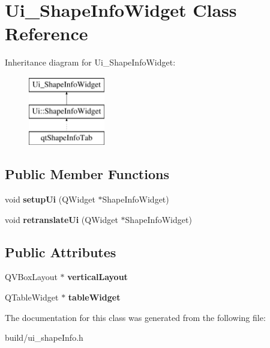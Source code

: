 \hypertarget{class_ui___shape_info_widget}{}\section{Ui\+\_\+\+Shape\+Info\+Widget Class Reference}
\label{class_ui___shape_info_widget}
Inheritance diagram for Ui\+\_\+\+Shape\+Info\+Widget\+:\begin{figure}[H]
\begin{center}
\leavevmode
\includegraphics[height=3.000000cm]{class_ui___shape_info_widget}
\end{center}
\end{figure}
\subsection*{Public Member Functions}
\begin{DoxyCompactItemize}
\item 
\hypertarget{class_ui___shape_info_widget_ab161b351a7474311a9a94a0723714aaf}{}void {\bfseries setup\+Ui} (Q\+Widget $\ast$Shape\+Info\+Widget)\label{class_ui___shape_info_widget_ab161b351a7474311a9a94a0723714aaf}

\item 
\hypertarget{class_ui___shape_info_widget_a266a6be952218bcc6e380a8f32f4b768}{}void {\bfseries retranslate\+Ui} (Q\+Widget $\ast$Shape\+Info\+Widget)\label{class_ui___shape_info_widget_a266a6be952218bcc6e380a8f32f4b768}

\end{DoxyCompactItemize}
\subsection*{Public Attributes}
\begin{DoxyCompactItemize}
\item 
\hypertarget{class_ui___shape_info_widget_a50ce45786d697a4f04b47f541bea9fe1}{}Q\+V\+Box\+Layout $\ast$ {\bfseries vertical\+Layout}\label{class_ui___shape_info_widget_a50ce45786d697a4f04b47f541bea9fe1}

\item 
\hypertarget{class_ui___shape_info_widget_ab63afd766c5c96176f41717048acf8a1}{}Q\+Table\+Widget $\ast$ {\bfseries table\+Widget}\label{class_ui___shape_info_widget_ab63afd766c5c96176f41717048acf8a1}

\end{DoxyCompactItemize}


The documentation for this class was generated from the following file\+:\begin{DoxyCompactItemize}
\item 
build/ui\+\_\+shape\+Info.\+h\end{DoxyCompactItemize}
